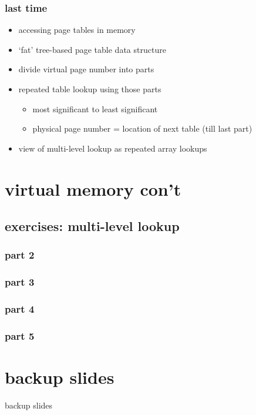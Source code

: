 \date{}
\title{}
\date{}

\begin{frame}
    \titlepage
\end{frame}






\begin{frame}
\frametitle{last time}
\begin{itemize}
    \item accessing page tables in memory
    \item `fat' tree-based page table data structure
    \item divide virtual page number into parts
    \item repeated table lookup using those parts
        \begin{itemize}
        \item most significant to least significant
        \item physical page number = location of next table (till last part)
        \end{itemize}
    \item view of multi-level lookup as repeated array lookups
\end{itemize}
\end{frame}

\section{virtual memory con't}
\subsection{exercises: multi-level lookup}
\subsubsection{part 2}

\subsubsection{part 3}


\subsubsection{part 4}

\subsubsection{part 5}





\section{backup slides}
\begin{frame}{backup slides}
\end{frame}


